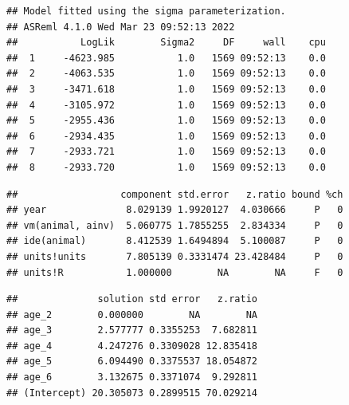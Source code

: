 \documentclass[
  12pt,
]{book}
\newenvironment{Shaded}{\begin{snugshade}}{\end{snugshade}}
\newcommand{\DataTypeTok}[1]{\textcolor[rgb]{0.13,0.29,0.53}{#1}}
\newcommand{\DecValTok}[1]{\textcolor[rgb]{0.00,0.00,0.81}{#1}}
\newcommand{\KeywordTok}[1]{\textcolor[rgb]{0.13,0.29,0.53}{\textbf{#1}}}
\newcommand{\NormalTok}[1]{#1}
\newcommand{\OperatorTok}[1]{\textcolor[rgb]{0.81,0.36,0.00}{\textbf{#1}}}
\newcommand{\OtherTok}[1]{\textcolor[rgb]{0.56,0.35,0.01}{#1}}
\newcommand{\StringTok}[1]{\textcolor[rgb]{0.31,0.60,0.02}{#1}}
\begin{document}
\begin{verbatim}
## Model fitted using the sigma parameterization.
## ASReml 4.1.0 Wed Mar 23 09:52:13 2022
##           LogLik        Sigma2     DF     wall    cpu
##  1     -4623.985           1.0   1569 09:52:13    0.0
##  2     -4063.535           1.0   1569 09:52:13    0.0
##  3     -3471.618           1.0   1569 09:52:13    0.0
##  4     -3105.972           1.0   1569 09:52:13    0.0
##  5     -2955.436           1.0   1569 09:52:13    0.0
##  6     -2934.435           1.0   1569 09:52:13    0.0
##  7     -2933.721           1.0   1569 09:52:13    0.0
##  8     -2933.720           1.0   1569 09:52:13    0.0
\end{verbatim}

\begin{Shaded}
\end{Shaded}

\begin{verbatim}
##                  component std.error   z.ratio bound %ch
## year              8.029139 1.9920127  4.030666     P   0
## vm(animal, ainv)  5.060775 1.7855255  2.834334     P   0
## ide(animal)       8.412539 1.6494894  5.100087     P   0
## units!units       7.805139 0.3331474 23.428484     P   0
## units!R           1.000000        NA        NA     F   0
\end{verbatim}

\begin{Shaded}
\end{Shaded}

\begin{verbatim}
##              solution std error   z.ratio
## age_2        0.000000        NA        NA
## age_3        2.577777 0.3355253  7.682811
## age_4        4.247276 0.3309028 12.835418
## age_5        6.094490 0.3375537 18.054872
## age_6        3.132675 0.3371074  9.292811
## (Intercept) 20.305073 0.2899515 70.029214
\end{verbatim}
\end{document}
